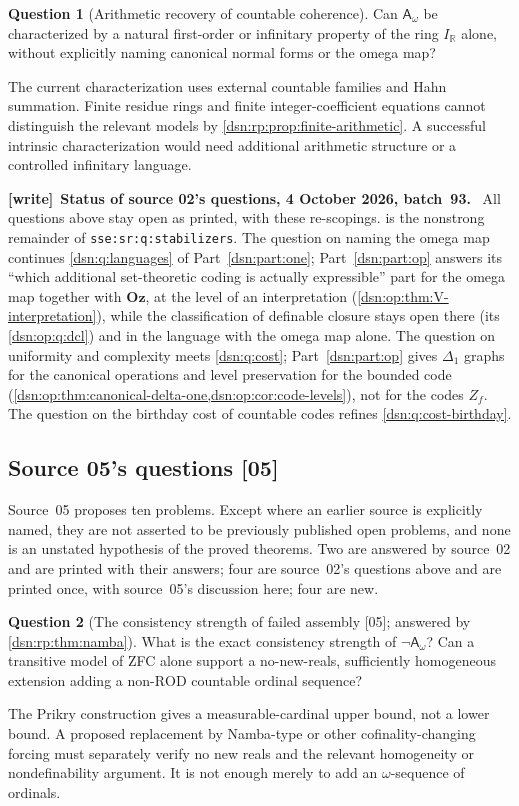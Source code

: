 \documentclass[11pt,a4paper]{article}
\numberwithin{equation}{section}
\theoremstyle{definition}
\newtheorem{question}[question]{Question}
\theoremstyle{remark}
\newcommand{\Oz}{\mathbf{Oz}}
\newcommand{\R}{\mathbb R}
\newcommand{\src}[1]{\textup{\textsf{\small[#1]}}}
\newcommand{\lbl}[1]{\nolinkurl{#1}}
\newenvironment{writenote}[1][]{\par\medskip\begingroup\small\noindent\textbf{[write]}\if\relax\detokenize{#1}\relax\else~\textbf{#1.}\fi~\ignorespaces}{\par\endgroup\medskip}
\newcommand{\ROD}{\mathrm{ROD}}
\newcommand{\IR}{I_{\R}}
\newcommand{\Asm}{\mathsf A_{\omega}}
\begin{document}
\begin{question}[Arithmetic recovery of countable coherence]
Can $\Asm$ be characterized by a natural first-order or infinitary
property of the ring $\IR$ alone, without explicitly naming canonical
normal forms or the omega map?
\end{question}
The current characterization uses external countable families and
Hahn summation. Finite residue rings and finite integer-coefficient
equations cannot distinguish the relevant models by
\cref{dsn:rp:prop:finite-arithmetic}. A successful intrinsic characterization
would need additional arithmetic structure or a controlled infinitary
language.


\begin{writenote}[Status of source 02's questions, 4 October 2026, batch~93]
All questions above stay open as printed, with these re-scopings.
 is the nonstrong remainder of
\lbl{sse:sr:q:stabilizers}. The question on naming the omega map continues
\cref{dsn:q:languages} of Part~\ref{dsn:part:one}; Part~\ref{dsn:part:op}
answers its ``which additional set-theoretic coding is actually
expressible'' part for the omega map together with $\Oz$, at the level of an
interpretation (\cref{dsn:op:thm:V-interpretation}), while the classification
of definable closure stays open there (its \cref{dsn:op:q:dcl}) and in the
language with the omega map alone. The question on uniformity and complexity
meets \cref{dsn:q:cost}; Part~\ref{dsn:part:op} gives $\Delta_1$ graphs for
the canonical operations and level preservation for the bounded code
(\cref{dsn:op:thm:canonical-delta-one,dsn:op:cor:code-levels}), not for the
codes $Z_f$. The question on the birthday cost of countable codes refines
\cref{dsn:q:cost-birthday}.
\end{writenote}

\subsection{Source 05's questions \src{05}}
\label{dsn:ca:sec:questions}

Source~05 proposes ten problems. Except where an earlier source is
explicitly named, they are not asserted to be previously published open
problems, and none is an unstated hypothesis of the proved theorems. Two are
answered by source~02 and are printed with their answers; four are source~02's
questions above and are printed once, with source~05's discussion here; four
are new.

\begin{question}[The consistency strength of failed assembly \src{05}; answered by \cref{dsn:rp:thm:namba}]\label{dsn:ca:q:strength}
What is the exact consistency strength of $\neg\Asm$? Can a transitive
model of ZFC alone support a no-new-reals, sufficiently homogeneous
extension adding a non-$\ROD$ countable ordinal sequence?
\end{question}
The Prikry construction gives a measurable-cardinal upper bound, not
a lower bound. A proposed replacement by Namba-type or other
cofinality-changing forcing must separately verify no new reals and
the relevant homogeneity or nondefinability argument. It is not enough
merely to add an $\omega$-sequence of ordinals.
\end{document}
